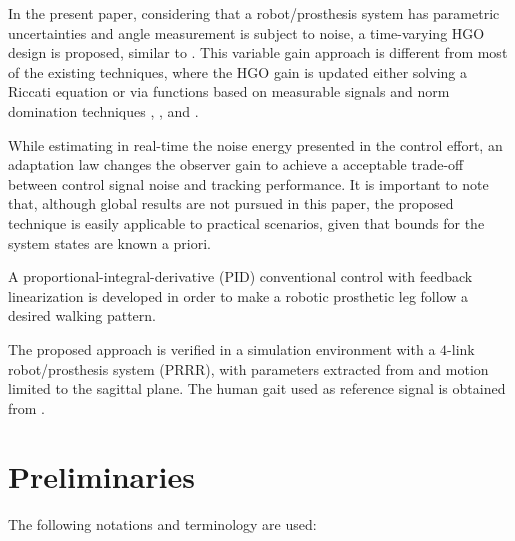 \documentclass[letterpaper, 10 pt, conference]{ieeeconf}  %
\theoremstyle{plain}
\theoremstyle{definition}
\theoremstyle{remark}
\begin{document}
In the present paper, considering that a robot/prosthesis system has parametric uncertainties and angle measurement is subject to noise, a time-varying HGO design is proposed, similar to \cite{POH:2011}. This variable gain approach is different from most of the existing techniques,
where the HGO gain is updated either solving a Riccati equation \cite{P:01}\cite{P:07}\cite{GAL:06} or via functions based on measurable signals and norm domination techniques \cite{LL:05}, \cite{P:07}, \cite{APA:09} and \cite{POH:2011}.

While estimating in real-time the noise energy presented in the control effort, an adaptation law changes the observer gain to achieve a acceptable trade-off between control signal noise and tracking performance. It is important to note that, although global results are not pursued in this paper, the proposed technique is easily applicable to practical scenarios, given that bounds for the system states are known a priori.

A proportional-integral-derivative (PID) conventional control with feedback linearization is developed in order to make a robotic prosthetic leg follow a desired walking pattern. 

The proposed approach is verified in a simulation environment with a $4$-link robot/prosthesis system (PRRR), with parameters extracted from \cite{Richter2015} and motion limited to the sagittal plane. The human gait used as reference signal is obtained from \cite{Schwartz2008}.


\section{Preliminaries}


The following notations and terminology are used:%


\end{document}
